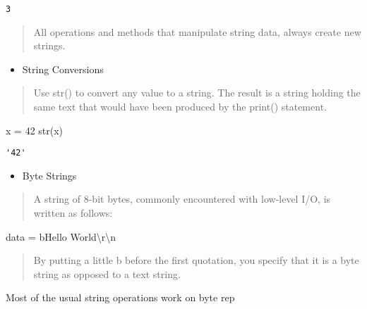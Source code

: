 \documentclass[
  letterpaper,
  DIV=11,
  numbers=noendperiod]{scrreprt}
\newenvironment{Shaded}{\begin{snugshade}}{\end{snugshade}}
\newcommand{\BuiltInTok}[1]{\textcolor[rgb]{0.00,0.46,0.62}{#1}}
\newcommand{\BuiltInTok}[1]{\textcolor[rgb]{0.00,0.48,0.65}{#1}}
\newcommand{\CharTok}[1]{\textcolor[rgb]{0.13,0.47,0.30}{#1}}
\newcommand{\DecValTok}[1]{\textcolor[rgb]{0.68,0.00,0.00}{#1}}
\newcommand{\NormalTok}[1]{\textcolor[rgb]{0.00,0.46,0.62}{#1}}
\newcommand{\OperatorTok}[1]{\textcolor[rgb]{0.37,0.37,0.37}{#1}}
\newcommand{\NormalTok}[1]{\textcolor[rgb]{0.00,0.48,0.65}{#1}}
\newcommand{\OperatorTok}[1]{\textcolor[rgb]{0.37,0.37,0.37}{#1}}
\newcommand{\StringTok}[1]{\textcolor[rgb]{0.13,0.47,0.30}{#1}}
\providecommand{\tightlist}{%
  \setlength{\itemsep}{0pt}\setlength{\parskip}{0pt}}
\begin{document}
\begin{Shaded}
\begin{Highlighting}[]
\begin{verbatim}
3
\end{verbatim}

\begin{quote}
All operations and methods that manipulate string data, always create
new strings.
\end{quote}

\begin{itemize}
\tightlist
\item
  String Conversions
\end{itemize}

\begin{quote}
Use str() to convert any value to a string. The result is a string
holding the same text that would have been produced by the print()
statement.
\end{quote}

\begin{Shaded}
\begin{Highlighting}[]
\NormalTok{x }\OperatorTok{=} \DecValTok{42}
\BuiltInTok{str}\NormalTok{(x)}
\end{Highlighting}
\end{Shaded}

\begin{verbatim}
'42'
\end{verbatim}

\begin{itemize}
\tightlist
\item
  Byte Strings
\end{itemize}

\begin{quote}
A string of 8-bit bytes, commonly encountered with low-level I/O, is
written as follows:
\end{quote}

\begin{Shaded}
\begin{Highlighting}[]
\NormalTok{data }\OperatorTok{=} \StringTok{b\textquotesingle{}Hello World}\CharTok{\textbackslash{}r\textbackslash{}n}\StringTok{\textquotesingle{}}
\end{Highlighting}
\end{Shaded}

\begin{quote}
By putting a little b before the first quotation, you specify that it is
a byte string as opposed to a text string.
\end{quote}

Most of the usual string operations work on byte rep


\end{Highlighting}
\end{Shaded}
\end{document}

